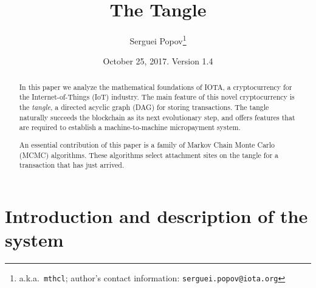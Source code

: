 \documentclass[12pt]{article}
\title{The Tangle}
\author{Serguei Popov\thanks{
a.k.a.\ \texttt{mthcl}; author's contact information:
\texttt{serguei.popov@iota.org}}
}
\date{October 25, 2017. Version 1.4}
\begin{document}
 \maketitle
\begin{abstract}
In this paper we analyze the mathematical foundations 
of IOTA, a cryptocurrency for the Internet-of-Things (IoT) industry. 
The main feature of this novel cryptocurrency is the \emph{tangle}, 
a directed acyclic graph (DAG) for storing transactions. The tangle
naturally succeeds the blockchain as its next evolutionary step,
and offers features that are required to establish a machine-to-machine micropayment
system. 

An essential contribution of this paper is a family of
Markov Chain Monte Carlo (MCMC) algorithms. These algorithms
select attachment sites on the tangle for a transaction that
has just arrived.

%

\end{abstract}

\section{Introduction and description of the system}
\label{s_general}
\end{document}
